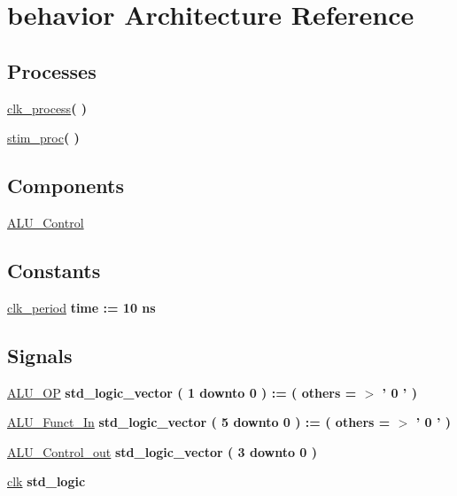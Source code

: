 \hypertarget{class_a_l_u___control__tb_1_1behavior}{\section{behavior \-Architecture \-Reference}
\label{class_a_l_u___control__tb_1_1behavior}
}
\*
\*
\subsection*{\-Processes}
 \begin{DoxyCompactItemize}
\item 
\hyperlink{class_a_l_u___control__tb_1_1behavior_ac5bb218131b813f7908ec89476b31fca}{clk\-\_\-process}{\bfseries  (  )}
\item 
\hyperlink{class_a_l_u___control__tb_1_1behavior_ad2efa6785cff833c341e27596b21aeb5}{stim\-\_\-proc}{\bfseries  (  )}
\end{DoxyCompactItemize}
\subsection*{\-Components}
 \begin{DoxyCompactItemize}
\item 
\hyperlink{class_a_l_u___control__tb_1_1behavior_abf60193336988d744deadd38bbf9d27a}{\-A\-L\-U\-\_\-\-Control}  {\bfseries }  
\end{DoxyCompactItemize}
\subsection*{\-Constants}
 \begin{DoxyCompactItemize}
\item 
\hyperlink{class_a_l_u___control__tb_1_1behavior_a8a175a7f832828463d31be056e0be9a5}{clk\-\_\-period} {\bfseries time  \-:=  10  ns } 
\end{DoxyCompactItemize}
\subsection*{\-Signals}
 \begin{DoxyCompactItemize}
\item 
\hyperlink{class_a_l_u___control__tb_1_1behavior_a815bf9e542a3c49c6651f755d08a4ac9}{\-A\-L\-U\-\_\-\-O\-P} {\bfseries std\-\_\-logic\-\_\-vector (   1    downto    0  )  \-:= (  others  = $>$ '  0  '  ) } 
\item 
\hyperlink{class_a_l_u___control__tb_1_1behavior_afe12d1d11e7ef94c862d25007711d671}{\-A\-L\-U\-\_\-\-Funct\-\_\-\-In} {\bfseries std\-\_\-logic\-\_\-vector (   5    downto    0  )  \-:= (  others  = $>$ '  0  '  ) } 
\item 
\hyperlink{class_a_l_u___control__tb_1_1behavior_a1b3e29926e973200886940842ebe8876}{\-A\-L\-U\-\_\-\-Control\-\_\-out} {\bfseries std\-\_\-logic\-\_\-vector (   3    downto    0  ) } 
\item 
\hyperlink{class_a_l_u___control__tb_1_1behavior_a94eb3ba5e2f4df12778cb4b26b5f9f2e}{clk} {\bfseries std\-\_\-logic } 
\end{DoxyCompactItemize}


